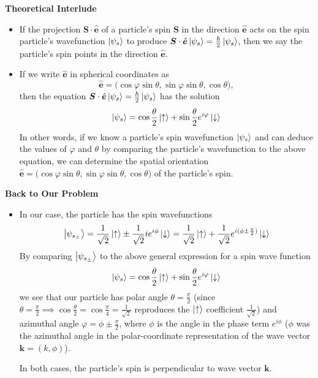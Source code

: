 \documentclass[11pt, a4paper]{article}
\renewcommand{\vec}[1]{\bm{#1}} %
\newcommand{\uvec}[1]{\hat{\vec{#1}}} %
\newcommand{\ua}{\uparrow}  %
\newcommand{\da}{\downarrow}  %
\renewcommand{\k}{\vec{k}}  %
\begin{document}
\textbf{Theoretical Interlude}
\begin{itemize}
	\item If the projection $ \vec{S} \cdot \uvec{e}$ of a particle's spin $ \vec{S} $ in the direction $ \uvec{e} $ acts on the spin particle's wavefunction $ \ket{\psi_{s}} $ to produce $  \vec{S} \cdot \uvec{e} \ket{\psi_{s}} = \frac{\hbar}{2}\ket{\psi_{s}} $, then we say the particle's spin points in the direction $ \uvec{e} $. 
	
	\item If we write $ \uvec{e} $ in spherical coordinates as 
	\begin{equation*}
		\uvec{e} = \big(\cos \varphi \sin \theta, \sin \varphi \sin \theta, \cos \theta\big),
	\end{equation*}
	then the equation $  \vec{S} \cdot \uvec{e} \ket{\psi_{s}} = \frac{\hbar}{2}\ket{\psi_{s}} $ has the solution 
	\begin{equation*}
		\ket{\psi_{s}} = \cos \frac{\theta}{2} \ket{\ua} + \sin \frac{\theta}{2} e^{i\varphi} \ket{\da}
	\end{equation*}
	In other words, if we know a particle's spin wavefunction $ \ket{\psi_{s}} $ and can deduce the values of $ \varphi $ and $ \theta $ by comparing the particle's wavefunction to the above equation, we can determine the spatial orientation $ \uvec{e} = \big(\cos \varphi \sin \theta, \sin \varphi \sin \theta, \cos \theta\big) $  of the particle's spin.
	
\end{itemize}

\textbf{Back to Our Problem}
\begin{itemize}
	\item In our case, the particle has the spin wavefunctions
	\begin{equation*}
		\ket{\psi_{s_{\pm}}} = \frac{1}{\sqrt{2}}\ket{\ua} \pm \frac{1}{\sqrt{2}} ie^{i\phi}\ket{\da} =  \frac{1}{\sqrt{2}}\ket{\ua} + \frac{1}{\sqrt{2}} e^{i(\phi \pm \frac{\pi}{2})}\ket{\da}
	\end{equation*} 
	By comparing $ \ket{\psi_{s_{\pm}}} $ to the above general expression for a spin wave function
	\begin{equation*}
		 \ket{\psi_{s}} = \cos \frac{\theta}{2} \ket{\ua} + \sin \frac{\theta}{2} e^{i\varphi} \ket{\da}
	\end{equation*}
	we see that our particle has polar angle $ \theta = \frac{\pi}{2} $ (since $ \theta = \frac{\pi}{2} \implies \cos \frac{\theta}{2} = \cos \frac{\pi}{4} = \frac{1}{\sqrt{2}} $ reproduces the $ \ket{\ua} $ coefficient $ \frac{1}{\sqrt{2}} $) and azimuthal angle $ \varphi = \phi \pm \frac{\pi}{2} $, where $ \phi $ is the angle in the phase term $ e^{i\phi} $ ($ \phi $ was the azimuthal angle in the polar-coordinate representation of the wave vector $ \k = (k, \phi) $). 
	
	In both cases, the particle's spin is perpendicular to wave vector $ \vec{k} $. 
\end{itemize}
\end{document}
